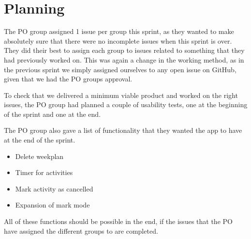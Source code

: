 \section{Planning}
The PO group assigned 1 issue per group this sprint, as they wanted to make absolutely sure that there were no incomplete issues when this sprint is over. 
They did their best to assign each group to issues related to something that they had previously worked on.
This was again a change in the working method, as in the previous sprint we simply assigned ourselves to any open issue on GitHub, given that we had the PO groups approval.

To check that we delivered a minimum viable product and worked on the right issues, the PO group had planned a couple of usability tests, one at the beginning of the sprint and one at the end.

The PO group also gave a list of functionality that they wanted the app to have at the end of the sprint.

\begin{itemize}
  \item Delete weekplan
  \item Timer for activities
  \item Mark activity as cancelled 
  \item Expansion of mark mode
\end{itemize}

All of these functions should be possible in the end, if the issues that the PO have assigned the different groups to are completed.
